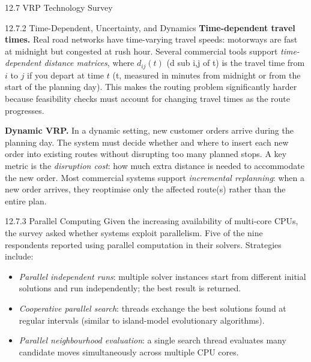 \documentclass[aspectratio=169,10pt]{beamer}
\begin{document}
\begin{frame}[allowframebreaks]{12.7 \; VRP Technology Survey}
  \framebreak

  \begin{block}{12.7.2 \; Time-Dependent, Uncertainty, and Dynamics}
    \textbf{Time-dependent travel times.}
    Real road networks have time-varying travel speeds:
    motorways are fast at midnight but congested at rush hour.
    Several commercial tools support \emph{time-dependent distance matrices},
    where $d_{ij}(t)$ (d sub i,j of t) is the travel time from $i$ to $j$
    if you depart at time $t$ (t, measured in minutes from midnight or
    from the start of the planning day).
    This makes the routing problem significantly harder because feasibility
    checks must account for changing travel times as the route progresses.

    \textbf{Dynamic VRP.}
    In a dynamic setting, new customer orders arrive during the planning day.
    The system must decide whether and where to insert each new order into
    existing routes without disrupting too many planned stops.
    A key metric is the \emph{disruption cost}: how much extra distance is
    needed to accommodate the new order.
    Most commercial systems support \emph{incremental replanning}: when a new
    order arrives, they reoptimise only the affected route(s) rather than
    the entire plan.
  \end{block}

  \framebreak

  \begin{block}{12.7.3 \; Parallel Computing}
    Given the increasing availability of multi-core CPUs, the survey asked
    whether systems exploit parallelism.
    Five of the nine respondents reported using parallel computation
    in their solvers.
    Strategies include:
    \begin{itemize}
      \item \emph{Parallel independent runs}: multiple solver instances
            start from different initial solutions and run independently;
            the best result is returned.
      \item \emph{Cooperative parallel search}: threads exchange
            the best solutions found at regular intervals (similar to
            island-model evolutionary algorithms).
      \item \emph{Parallel neighbourhood evaluation}: a single search
            thread evaluates many candidate moves simultaneously across
            multiple CPU cores.
    \end{itemize}
  \end{block}


\end{frame}
\end{document}
